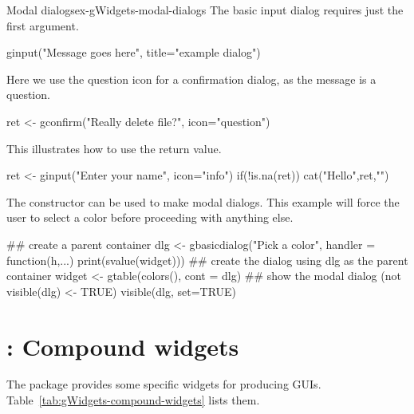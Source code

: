 \begin{example}{Modal dialogs}{ex-gWidgets-modal-dialogs}
The basic input dialog requires just the first argument.
\begin{Schunk}
\begin{Sinput}
 ginput("Message goes here", title="example dialog")
\end{Sinput}
\end{Schunk}

Here we use the question icon for a confirmation dialog, as the message is a question.
\begin{Schunk}
\begin{Sinput}
 ret <- gconfirm("Really delete file?", icon="question")
\end{Sinput}
\end{Schunk}

This illustrates how to use the return value.
\begin{Schunk}
\begin{Sinput}
 ret <- ginput("Enter your name", icon="info")
 if(!is.na(ret)) 
   cat("Hello",ret,"\n")
\end{Sinput}
\end{Schunk}

The  constructor can be used to make modal
dialogs. This example will force the user to
select a color before proceeding with anything else. 
\begin{Schunk}
\begin{Sinput}
 ## create a parent container
 dlg <- gbasicdialog("Pick a color", handler = 
                     function(h,...) print(svalue(widget)))
 ## create the dialog using dlg as the parent container
 widget <- gtable(colors(), cont = dlg)
 ## show the modal dialog (not visible(dlg) <- TRUE)
 visible(dlg, set=TRUE)    
\end{Sinput}
\end{Schunk}

\end{example}
















\section{: Compound widgets}
\label{sec:compound-widgets}
The  package provides some \R\/ specific widgets for
producing GUIs. Table~\ref{tab:gWidgets-compound-widgets} lists them.


